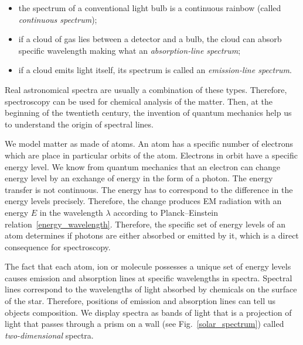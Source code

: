 \begin{itemize}
	\item the spectrum of a conventional light bulb is a continuous rainbow (called \textit{continuous spectrum});
	\item if a cloud of gas lies between a detector and a bulb,
		the cloud can absorb specific wavelength making what an \textit{absorption-line spectrum};
	\item if a cloud emits light itself, its spectrum is called an \textit{emission-line spectrum}.
\end{itemize}

Real astronomical spectra are usually a combination of these types.
Therefore, spectroscopy can be used for chemical analysis of the matter.
Then, at the beginning of the twentieth century,
the invention of quantum mechanics help us to understand the origin of spectral lines.

We model matter as made of atoms.
An atom has a specific number of electrons which are place in particular orbits of the atom.
Electrons in orbit have a specific energy level.
We know from quantum mechanics that an electron can change energy level by an exchange of energy in the form of a photon.
The energy transfer is not continuous.
The energy has to correspond to the difference in the energy levels precisely.
Therefore, the change produces EM radiation with an energy \(E\) in the wavelength \(\lambda\)
according to Planck--Einstein relation~\ref{energy_wavelength}.
Therefore, the specific set of energy levels of an atom determines
if photons are either absorbed or emitted by it,
which is a direct consequence for spectroscopy.~\cite{cochard2018}

The fact that each atom, ion or molecule possesses a unique set of energy levels
causes emission and absorption lines at specific wavelengths in spectra.
Spectral lines correspond to the wavelengths of light absorbed by chemicals on the surface of the star.
Therefore, positions of emission and absorption lines can tell us objects composition.
We display spectra as bands of light that is a projection of light
that passes through a prism on a wall (see Fig.~\ref{solar_spectrum})
called \textit{two-dimensional} spectra.~\cite{cochard2018}

